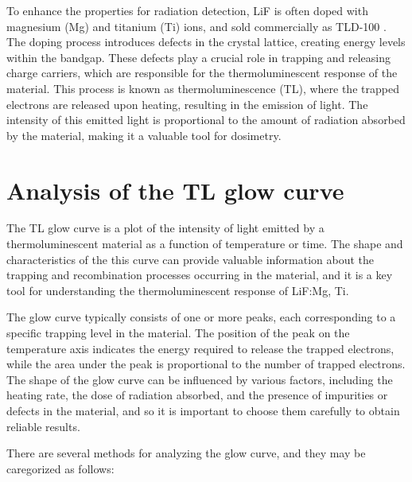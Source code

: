 \vspace{10pt}

To enhance the properties for radiation detection, LiF is often doped with magnesium (Mg) and titanium (Ti) ions, and sold commercially as TLD-100 \cite{lif}. The doping process introduces defects in the crystal lattice, creating energy levels within the bandgap. These defects play a crucial role in trapping and releasing charge carriers, which are responsible for the thermoluminescent response of the material. This process is known as thermoluminescence (TL), where the trapped electrons are released upon heating, resulting in the emission of light. The intensity of this emitted light is proportional to the amount of radiation absorbed by the material, making it a valuable tool for dosimetry.

\section{Analysis of the TL glow curve} \label{sec:theoryTLcurves}

The TL glow curve is a plot of the intensity of light emitted by a thermoluminescent material as a function of temperature or time. The shape and characteristics of the this curve can provide valuable information about the trapping and recombination processes occurring in the material, and it is a key tool for understanding the thermoluminescent response of LiF:Mg, Ti. 

\vspace{10pt}

The glow curve typically consists of one or more peaks, each corresponding to a specific trapping level in the material. The position of the peak on the temperature axis indicates the energy required to release the trapped electrons, while the area under the peak is proportional to the number of trapped electrons. 
The shape of the glow curve can be influenced by various factors, including the heating rate, the dose of radiation absorbed, and the presence of impurities or defects in the material, and so it is important to choose them carefully to obtain reliable results.%

\vspace{10pt}

There are several methods for analyzing the glow curve, and they may be caregorized as follows:

